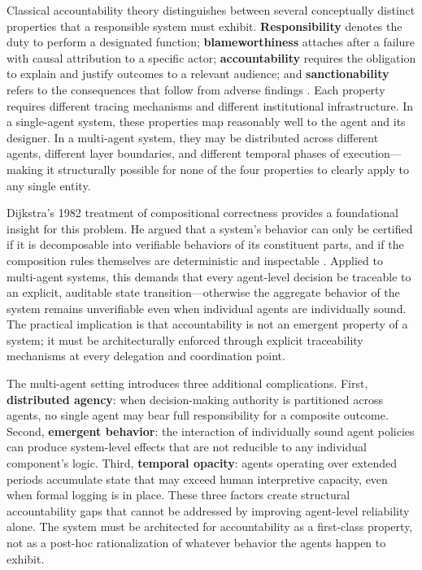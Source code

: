 Classical accountability theory distinguishes between several conceptually distinct properties that a responsible system must exhibit. \textbf{Responsibility} denotes the duty to perform a designated function; \textbf{blameworthiness} attaches after a failure with causal attribution to a specific actor; \textbf{accountability} requires the obligation to explain and justify outcomes to a relevant audience; and \textbf{sanctionability} refers to the consequences that follow from adverse findings \cite{bansal2019}. Each property requires different tracing mechanisms and different institutional infrastructure. In a single-agent system, these properties map reasonably well to the agent and its designer. In a multi-agent system, they may be distributed across different agents, different layer boundaries, and different temporal phases of execution—making it structurally possible for none of the four properties to clearly apply to any single entity.

Dijkstra's 1982 treatment of compositional correctness provides a foundational insight for this problem. He argued that a system's behavior can only be certified if it is decomposable into verifiable behaviors of its constituent parts, and if the composition rules themselves are deterministic and inspectable \cite{dijkstra1982}. Applied to multi-agent systems, this demands that every agent-level decision be traceable to an explicit, auditable state transition—otherwise the aggregate behavior of the system remains unverifiable even when individual agents are individually sound. The practical implication is that accountability is not an emergent property of a system; it must be architecturally enforced through explicit traceability mechanisms at every delegation and coordination point.

The multi-agent setting introduces three additional complications. First, \textbf{distributed agency}: when decision-making authority is partitioned across agents, no single agent may bear full responsibility for a composite outcome. Second, \textbf{emergent behavior}: the interaction of individually sound agent policies can produce system-level effects that are not reducible to any individual component's logic. Third, \textbf{temporal opacity}: agents operating over extended periods accumulate state that may exceed human interpretive capacity, even when formal logging is in place. These three factors create structural accountability gaps that cannot be addressed by improving agent-level reliability alone. The system must be architected for accountability as a first-class property, not as a post-hoc rationalization of whatever behavior the agents happen to exhibit.

